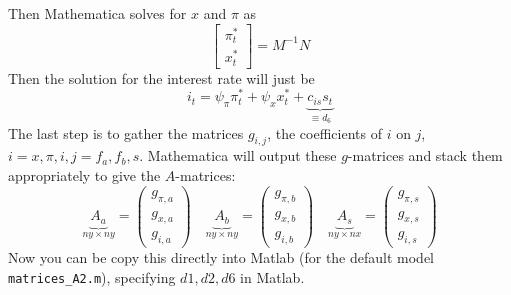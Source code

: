 \documentclass[11pt]{article}
\renewcommand{\[}{\begin{equation}}
\renewcommand{\]}{\end{equation}}
\begin{document}
Then Mathematica solves for $x$ and $\pi$ as \begin{equation}
\begin{bmatrix} \pi_t^* \\ x_t^* \end{bmatrix} = M^{-1}N \label{MN}
\end{equation}
Then the solution for the interest rate will just be
\begin{equation}
i_t = \psi_{\pi}\pi_t^* + \psi_{x} x_t^*  +\underbrace{c_{is} s_t}_{\equiv d_6}
\end{equation}
The last step is to gather the matrices $g_{i,j}$, the coefficients of $i$ on $j$, $i=x,\pi,i, j=f_a,f_b,s$. Mathematica will output these $g$-matrices and stack them appropriately to give the $A$-matrices:
\begin{equation}
\underbrace{A_a}_{ny \times ny} = \begin{pmatrix} g_{\pi,a} \\ g_{x,a} \\ g_{i,a}\end{pmatrix} \quad 
\underbrace{A_b}_{ny \times ny} = \begin{pmatrix} g_{\pi,b} \\ g_{x,b} \\ g_{i,b}\end{pmatrix} \quad 
\underbrace{A_s}_{ny \times nx} = \begin{pmatrix} g_{\pi,s} \\ g_{x,s} \\ g_{i,s}\end{pmatrix}
\end{equation}
Now you can be copy this directly into Matlab (for the default model \texttt{matrices\_A2.m}), specifying $d1, d2, d6$ in Matlab.
\end{document}
